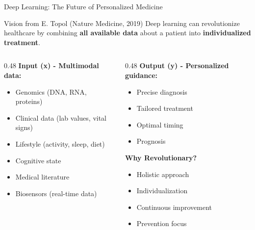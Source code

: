 \documentclass[aspectratio=169, 10pt]{beamer}
\begin{document}
\begin{frame}{Deep Learning: The Future of Personalized Medicine}

    \begin{block}{\footnotesize Vision from E. Topol (Nature Medicine, 2019)}
        \footnotesize
        Deep learning can revolutionize healthcare by combining \textbf{all available data} about a patient into \textbf{individualized treatment}.
    \end{block}

    \vspace{2mm}
    \begin{columns}
        \begin{column}{0.48\textwidth}
            \textbf{Input (x) - Multimodal data:}
            \begin{itemize}
                \item Genomics (DNA, RNA, proteins)
                \item Clinical data (lab values, vital signs)
                \item Lifestyle (activity, sleep, diet)
                \item Cognitive state
                \item Medical literature
                \item Biosensors (real-time data)
            \end{itemize}
        \end{column}

        \begin{column}{0.48\textwidth}
            \textbf{Output (y) - Personalized guidance:}
            \begin{itemize}
                \item Precise diagnosis
                \item Tailored treatment
                \item Optimal timing
                \item Prognosis
            \end{itemize}

            \vspace{2mm}
            \textbf{Why Revolutionary?}
            \begin{itemize}
                \item Holistic approach
                \item Individualization
                \item Continuous improvement
                \item Prevention focus
            \end{itemize}
        \end{column}
    \end{columns}


\end{frame}
\end{document}
